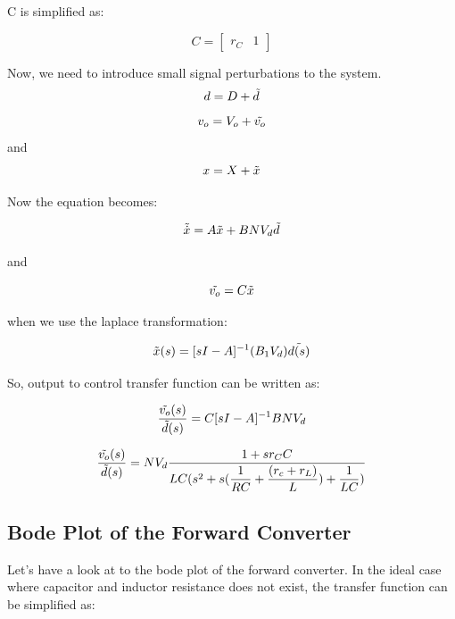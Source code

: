 C is simplified as:

\begin{equation}
C =
    \begin{bmatrix}
    r_C & 1
    \end{bmatrix}
\end{equation}

Now, we need to introduce small signal perturbations to the system.
\begin{equation}
  d = D + \Tilde{d}  
\end{equation}
\begin{equation}
  v_o = V_o + \Tilde{v_o}  
\end{equation}
and 
\begin{equation}
  x = X + \Tilde{x}  
\end{equation}

Now the equation becomes:

\begin{equation}
    \Tilde{\Dot{x}} = A\Tilde{x} + B N V_d \Tilde{d}
\end{equation}

and 

\begin{equation}
    \Tilde{v_o} = C\Tilde{x}
\end{equation}

when we use the laplace transformation:

\begin{equation}
    \Tilde{x}(s) = [sI-A]^{-1}(B_1 V_d)\Tilde{d(s)}
\end{equation}

So, output to control transfer function can be written as:

\begin{equation}
\dfrac{\Tilde{v_o}(s)}{\Tilde{d}(s)} = C[sI-A]^{-1} B N V_d    
\end{equation}

\begin{equation}
   \dfrac{\Tilde{v_o}(s)}{\Tilde{d}(s)} = NV_d \dfrac{1 + sr_C C}{LC (s^2 + s (\dfrac{1}{RC} + \dfrac{(r_c + r_L)}{L}) + \dfrac{1}{LC}) }
\end{equation}

\subsection{Bode Plot of the Forward Converter}

Let's have a look at to the bode plot of the forward converter. In the ideal case where capacitor and inductor resistance does not exist, the transfer function can be simplified as:

